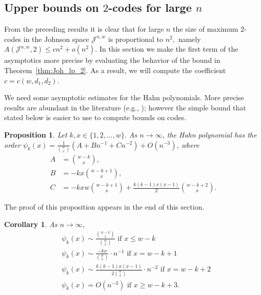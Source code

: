 \documentclass{amsart}
\newtheorem{corollaryenv}[definitionenv]{Corollary}
\newtheorem{propositionenv}[definitionenv]{Proposition}
\newenvironment{corollary}{\begin{corollaryenv}\rm}{\end{corollaryenv}}
\newenvironment{proposition}{\begin{propositionenv}\rm}{\end{propositionenv}}
\newcommand{\cJ}{\mathcal{J}}
\begin{document}
\subsection{Upper bounds on \texorpdfstring{$2$}--codes for large \texorpdfstring{$n$}.}\label{sec:large-n}
From the preceding results it is clear that for large $n$ the size of maximum 2-codes in the Johnson space $\cJ^{n,w}$ is proportional
to $n^2,$  namely $A(\cJ^{n,w},2) \le cn^2+o(n^2).$ In this section we make the first term of the asymptotics more precise by
evaluating the behavior of the bound in Theorem~\ref{thm:Joh_lp_2}. As a result, we will compute the coefficient $c=c(w,d_1,d_2)$.  


We need some asymptotic estimates for the Hahn polynomials. More precise results are abundant in the literature (e.g., 
\cite{LW13}); however the simple bound that stated below is easier to use to compute bounds on codes.
\begin{proposition}\label{prop: Hahn}
Let $k,x\in\{1,2,\dots,w\}.$ As $n \to \infty$, the Hahn polynomial has the order $\psi_k(x) = \frac{1}{\binom{w}{x}}(A + Bn^{-1} + Cn^{-2}) + O(n^{-3})$, where
\begin{align*}
    A &= \binom{w-k}{x}, \\
    B &= -kx\binom{w-k+1}{x}, \\
    C &= -kxw\binom{w-k+1}{x} + \frac{k(k-1)x(x-1)}{2}\binom{w-k+2}{x}.
\end{align*}
\end{proposition}

The proof of this proposition appears in the end of this section.

\begin{corollary}
As $n \to \infty$,
 \begin{align*}
 &\psi_k(x) \sim \frac{\binom{w-k}{x}}{\binom{w}{x}}\text{ if }x \leq w-k\\
 & \psi_k(x) \sim \frac{-kx}{\binom{w}{x}} \cdot n^{-1}\text{ if }x = w-k+1\\
  & \psi_k(x) \sim \frac{k(k-1)x(x-1)}{2\binom{w}{x}} \cdot n^{-2}\text{ if }x = w-k+2\\
 & \psi_k(x) = O(n^{-3})\text{ if }x \geq w-k+3.\\
\end{align*}
\end{corollary}
\end{document}
